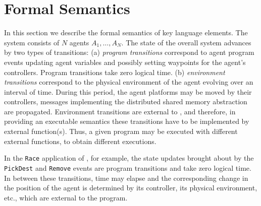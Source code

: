\section[h]{Formal Semantics}
\label{sect:semantics}

In this section we describe the formal semantics of key language elements. 
The system consists of $N$ agents $A_1,\ldots,A_N$. The state of the overall system advances by two types of transitions: 
(a) {\em program transitions\/} correspond to agent program events updating agent variables and possibly setting waypoints for the agent's controllers. Program transitions take zero logical time.
(b) {\em environment transitions\/} 
correspond to the physical environment of the agent evolving over an interval of time. During this period, the agent platforms may be moved by their controllers, messages implementing the distributed shared memory abstraction are propagated. 
Environment transitions  are external to \rolang, and therefore, in providing an executable semantics these transitions have to be implemented by external function(s).
%
Thus, a given \rolang program may be executed with different  external functions, to obtain different executions.
%

In the \texttt{Race} application of , for example, the state updates brought about by the \texttt{PickDest} and \texttt{Remove} events are program transitions and take zero logical time. In between these transitions, time may elapse and the corresponding change in the position of the agent is determined by its controller, its physical environment, etc., which are external to the program. 

%
%

